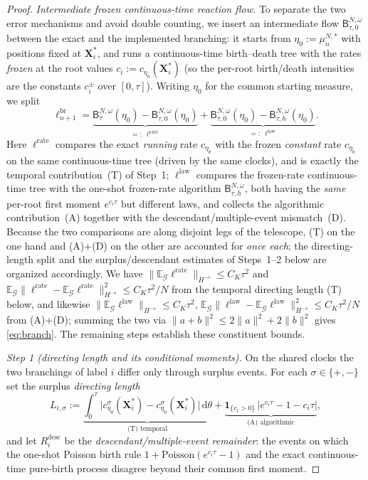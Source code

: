 \documentclass[a4paper,fleqn]{cas-sc}
\theoremstyle{definition}
\theoremstyle{remark}
\begin{document}
\begin{proof}
\emph{Intermediate frozen continuous-time reaction flow.} To separate the two error
mechanisms and avoid double counting, we
insert an intermediate flow $\mathsf B^{N,\omega}_{\tau,0}$ between the exact and the
implemented branching: it starts from $\eta_0:=\mu^{N,*}_n$ with positions fixed at
$\mathbf X^*_i$, and runs a continuous-time birth--death tree with the rates
\emph{frozen} at the root values $c_i:=c_{\eta_0}(\mathbf X^*_i)$ (so the per-root
birth/death intensities are the constants $c^\pm_i$ over $[0,\tau]$). Writing
$\eta_0$ for the common starting measure, we split
\[
\ell^{\mathrm{br}}_{n+1}
=\underbrace{\mathsf B^{N,\omega}_\tau(\eta_0)-\mathsf B^{N,\omega}_{\tau,0}(\eta_0)}_{=:\ \ell^{\mathrm{rate}}}
+\underbrace{\mathsf B^{N,\omega}_{\tau,0}(\eta_0)-\mathsf B^{N,\omega}_{\tau,h}(\eta_0)}_{=:\ \ell^{\mathrm{law}}}.
\]
Here $\ell^{\mathrm{rate}}$ compares the exact \emph{running} rate $c_{\eta_\theta}$ with
the frozen \emph{constant} rate $c_{\eta_0}$ on the same continuous-time tree (driven by
the same clocks), and is exactly the temporal contribution~(T) of Step~1; $\ell^{\mathrm{law}}$
compares the frozen-rate continuous-time tree with the one-shot frozen-rate algorithm
$\mathsf B^{N,\omega}_{\tau,h}$, both having the \emph{same} per-root first moment
$e^{c_i\tau}$ but different laws, and collects the algorithmic contribution~(A)
together with the descendant/multiple-event mismatch~(D). Because the two
comparisons are along disjoint legs of the telescope, (T) on the one hand and (A)+(D)
on the other are accounted for \emph{once each}; the directing-length split and the
surplus/descendant estimates of Steps~1--2 below are organized accordingly. We have
$\|\mathbb E_{\mathcal G}\ell^{\mathrm{rate}}\|_{H^{-s}}\le C_K\tau^2$ and
$\mathbb E_{\mathcal G}\|\ell^{\mathrm{rate}}-\mathbb E_{\mathcal G}\ell^{\mathrm{rate}}\|_{H^{-s}}^2\le C_K\tau^2/N$
from the temporal directing length (T) below, and likewise
$\|\mathbb E_{\mathcal G}\ell^{\mathrm{law}}\|_{H^{-s}}\le C_K\tau^2$,
$\mathbb E_{\mathcal G}\|\ell^{\mathrm{law}}-\mathbb E_{\mathcal G}\ell^{\mathrm{law}}\|_{H^{-s}}^2\le C_K\tau^2/N$
from (A)+(D); summing the two via $\|a+b\|^2\le2\|a\|^2+2\|b\|^2$ gives
\eqref{eq:branch}. The remaining steps establish these constituent bounds.

\emph{Step 1 (directing length and its conditional moments).} On the shared clocks
the two branchings of label $i$ differ only through surplus events. For each
$\sigma\in\{+,-\}$ set the surplus \emph{directing length}
\[
L_{i,\sigma}:=\underbrace{\int_0^\tau\bigl|c^\sigma_{\eta_\theta}(\mathbf X^*_i)
-c^\sigma_{\eta_0}(\mathbf X^*_i)\bigr|\,\mathrm d\theta}_{\text{(T) temporal}}
+\underbrace{\mathbf 1_{\{c_i>0\}}\,\bigl|e^{c_i\tau}-1-c_i\tau\bigr|}_{\text{(A) algorithmic}},
\]
and let $R^{\mathrm{desc}}_i$ be the \emph{descendant/multiple-event remainder}: the
events on which the one-shot Poisson birth rule $1+\mathrm{Poisson}(e^{c_i\tau}-1)$
and the exact continuous-time pure-birth process disagree beyond their common
first moment.


\end{proof}
\end{document}
